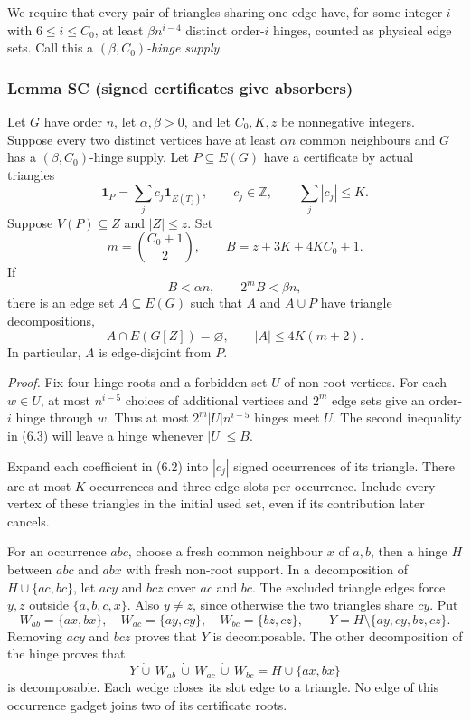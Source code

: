 \documentclass[english,11pt,a4paper]{article}
\begin{document}
We require that every pair of triangles sharing one edge have, for some integer \(i\) with \(6\le i\le C_0\), at least \(\beta n^{i-4}\) distinct order-\(i\) hinges, counted as physical edge sets. Call this a \emph{\((\beta,C_0)\)-hinge supply}.

\subsubsection{Lemma SC (signed certificates give absorbers)}\label{lemma-sc-signed-certificates-give-absorbers}

Let \(G\) have order \(n\), let \(\alpha,\beta>0\), and let \(C_0,K,z\) be nonnegative integers. Suppose every two distinct vertices have at least \(\alpha n\) common neighbours and \(G\) has a \((\beta,C_0)\)-hinge supply. Let \(P\subseteq E(G)\) have a certificate by actual triangles \[\mathbf1_P=\sum_j c_j\mathbf1_{E(T_j)},\qquad c_j\in\mathbb Z,
\qquad \sum_j|c_j|\le K.
\tag{6.2}\] Suppose \(V(P)\subseteq Z\) and \(|Z|\le z\). Set \[m=\binom{C_0+1}{2},\qquad B=z+3K+4KC_0+1.\] If \[B<\alpha n,\qquad 2^mB<\beta n,
\tag{6.3}\] there is an edge set \(A\subseteq E(G)\) such that \(A\) and \(A\cup P\) have triangle decompositions, \[A\cap E(G[Z])=\varnothing,\qquad |A|\le4K(m+2).
\tag{6.4}\] In particular, \(A\) is edge-disjoint from \(P\).

\emph{Proof.} Fix four hinge roots and a forbidden set \(U\) of non-root vertices. For each \(w\in U\), at most \(n^{i-5}\) choices of additional vertices and \(2^m\) edge sets give an order-\(i\) hinge through \(w\). Thus at most \(2^m|U|n^{i-5}\) hinges meet \(U\). The second inequality in (6.3) will leave a hinge whenever \(|U|\le B\).

Expand each coefficient in (6.2) into \(|c_j|\) signed occurrences of its triangle. There are at most \(K\) occurrences and three edge slots per occurrence. Include every vertex of these triangles in the initial used set, even if its contribution later cancels.

For an occurrence \(abc\), choose a fresh common neighbour \(x\) of \(a,b\), then a hinge \(H\) between \(abc\) and \(abx\) with fresh non-root support. In a decomposition of \(H\cup\{ac,bc\}\), let \(acy\) and \(bcz\) cover \(ac\) and \(bc\). The excluded triangle edges force \(y,z\) outside \(\{a,b,c,x\}\). Also \(y\ne z\), since otherwise the two triangles share \(cy\). Put \[W_{ab}=\{ax,bx\},\quad W_{ac}=\{ay,cy\},\quad W_{bc}=\{bz,cz\},
\qquad Y=H\setminus\{ay,cy,bz,cz\}.
\tag{6.5}\] Removing \(acy\) and \(bcz\) proves that \(Y\) is decomposable. The other decomposition of the hinge proves that \[Y\,\dot\cup\,W_{ab}\,\dot\cup\,W_{ac}\,\dot\cup\,W_{bc}
=H\cup\{ax,bx\}
\tag{6.6}\] is decomposable. Each wedge closes its slot edge to a triangle. No edge of this occurrence gadget joins two of its certificate roots.
\end{document}

